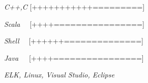 \begin{cvline}
  \cvsingleline 
    {
      \begin{cvitems}
          \item {\it{C++,C}}  {[+++++++++++=========]}
          \item {\it{Scala\,\,\,\,\,\,}}  {[++++================]}
          \item {\it{Shell\,\,\,\,\,\,}}  {[++++++==============]}
          \item {\it{Java\,\,\,\,\,\,\,}}   {[++++================]}
          \item {\it{ELK, Linux, Visual Studio, Eclipse}}
      \end{cvitems}
    }
\end{cvline}
